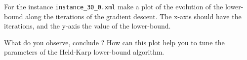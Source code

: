 \documentclass[12pt]{report}
\newcommand{\answerbox}[2]{\hfill\break\\
        \framebox[\linewidth]{\parbox[c][#1][c]{\dimexpr\linewidth-2\fboxsep-2\fboxrule}{#2}}
}
\begin{document}
\pagebreak


\begin{Exercise}[title={Held and Karp lower-bound}]

\Question For the instance \verb|instance_30_0.xml| make a plot of the evolution of the lower-bound along the iterations of the gradient descent. The x-axis should have the iterations, and the y-axis the value of the lower-bound.
\answerbox{12cm}{
}


\Question What do you observe, conclude ? How can this plot help you to tune the parameters of the Held-Karp lower-bound algorithm.
\answerbox{6cm}{
}


\end{Exercise}
\end{document}
